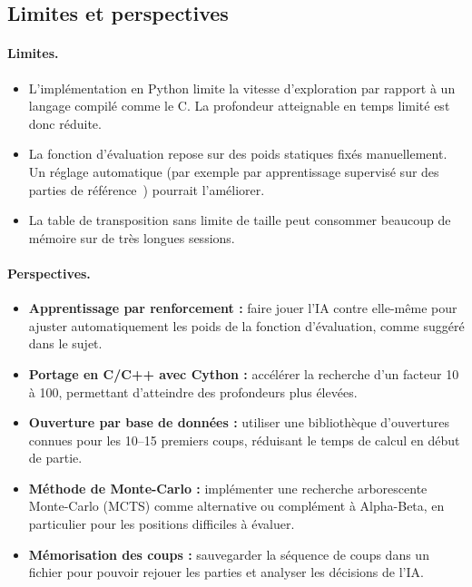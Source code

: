 \documentclass[12pt, a4paper]{article}
\begin{document}
\subsection{Limites et perspectives}

\paragraph{Limites.}
\begin{itemize}
    \item L'implémentation en Python limite la vitesse d'exploration par rapport à un langage compilé comme le C. La profondeur atteignable en temps limité est donc réduite.
    \item La fonction d'évaluation repose sur des poids statiques fixés manuellement. Un réglage automatique (par exemple par apprentissage supervisé sur des parties de référence~\cite{buro1997}) pourrait l'améliorer.
    \item La table de transposition sans limite de taille peut consommer beaucoup de mémoire sur de très longues sessions.
\end{itemize}

\paragraph{Perspectives.}
\begin{itemize}
    \item \textbf{Apprentissage par renforcement :} faire jouer l'IA contre elle-même pour ajuster automatiquement les poids de la fonction d'évaluation, comme suggéré dans le sujet.
    \item \textbf{Portage en C/C++ avec Cython :} accélérer la recherche d'un facteur 10 à 100, permettant d'atteindre des profondeurs plus élevées.
    \item \textbf{Ouverture par base de données :} utiliser une bibliothèque d'ouvertures connues pour les 10--15 premiers coups, réduisant le temps de calcul en début de partie.
    \item \textbf{Méthode de Monte-Carlo :} implémenter une recherche arborescente Monte-Carlo (MCTS) comme alternative ou complément à Alpha-Beta, en particulier pour les positions difficiles à évaluer.
    \item \textbf{Mémorisation des coups :} sauvegarder la séquence de coups dans un fichier pour pouvoir rejouer les parties et analyser les décisions de l'IA.
\end{itemize}
\end{document}
